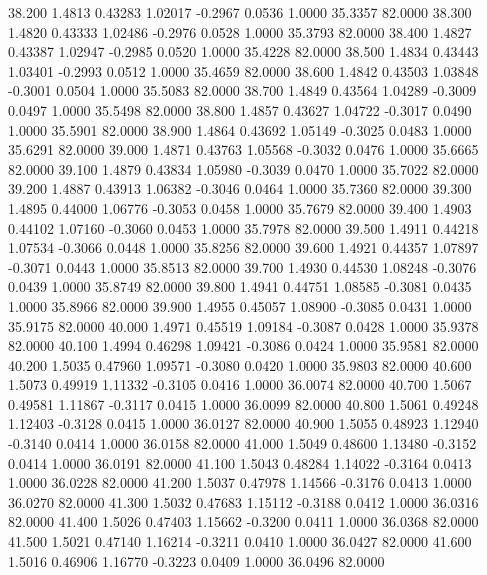   38.200   1.4813   0.43283   1.02017  -0.2967   0.0536   1.0000  35.3357  82.0000
  38.300   1.4820   0.43333   1.02486  -0.2976   0.0528   1.0000  35.3793  82.0000
  38.400   1.4827   0.43387   1.02947  -0.2985   0.0520   1.0000  35.4228  82.0000
  38.500   1.4834   0.43443   1.03401  -0.2993   0.0512   1.0000  35.4659  82.0000
  38.600   1.4842   0.43503   1.03848  -0.3001   0.0504   1.0000  35.5083  82.0000
  38.700   1.4849   0.43564   1.04289  -0.3009   0.0497   1.0000  35.5498  82.0000
  38.800   1.4857   0.43627   1.04722  -0.3017   0.0490   1.0000  35.5901  82.0000
  38.900   1.4864   0.43692   1.05149  -0.3025   0.0483   1.0000  35.6291  82.0000
  39.000   1.4871   0.43763   1.05568  -0.3032   0.0476   1.0000  35.6665  82.0000
  39.100   1.4879   0.43834   1.05980  -0.3039   0.0470   1.0000  35.7022  82.0000
  39.200   1.4887   0.43913   1.06382  -0.3046   0.0464   1.0000  35.7360  82.0000
  39.300   1.4895   0.44000   1.06776  -0.3053   0.0458   1.0000  35.7679  82.0000
  39.400   1.4903   0.44102   1.07160  -0.3060   0.0453   1.0000  35.7978  82.0000
  39.500   1.4911   0.44218   1.07534  -0.3066   0.0448   1.0000  35.8256  82.0000
  39.600   1.4921   0.44357   1.07897  -0.3071   0.0443   1.0000  35.8513  82.0000
  39.700   1.4930   0.44530   1.08248  -0.3076   0.0439   1.0000  35.8749  82.0000
  39.800   1.4941   0.44751   1.08585  -0.3081   0.0435   1.0000  35.8966  82.0000
  39.900   1.4955   0.45057   1.08900  -0.3085   0.0431   1.0000  35.9175  82.0000
  40.000   1.4971   0.45519   1.09184  -0.3087   0.0428   1.0000  35.9378  82.0000
  40.100   1.4994   0.46298   1.09421  -0.3086   0.0424   1.0000  35.9581  82.0000
  40.200   1.5035   0.47960   1.09571  -0.3080   0.0420   1.0000  35.9803  82.0000
  40.600   1.5073   0.49919   1.11332  -0.3105   0.0416   1.0000  36.0074  82.0000
  40.700   1.5067   0.49581   1.11867  -0.3117   0.0415   1.0000  36.0099  82.0000
  40.800   1.5061   0.49248   1.12403  -0.3128   0.0415   1.0000  36.0127  82.0000
  40.900   1.5055   0.48923   1.12940  -0.3140   0.0414   1.0000  36.0158  82.0000
  41.000   1.5049   0.48600   1.13480  -0.3152   0.0414   1.0000  36.0191  82.0000
  41.100   1.5043   0.48284   1.14022  -0.3164   0.0413   1.0000  36.0228  82.0000
  41.200   1.5037   0.47978   1.14566  -0.3176   0.0413   1.0000  36.0270  82.0000
  41.300   1.5032   0.47683   1.15112  -0.3188   0.0412   1.0000  36.0316  82.0000
  41.400   1.5026   0.47403   1.15662  -0.3200   0.0411   1.0000  36.0368  82.0000
  41.500   1.5021   0.47140   1.16214  -0.3211   0.0410   1.0000  36.0427  82.0000
  41.600   1.5016   0.46906   1.16770  -0.3223   0.0409   1.0000  36.0496  82.0000
